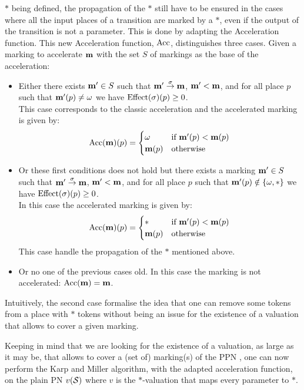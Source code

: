 $*$ being defined, the propagation of the $*$ still have to be ensured in the cases where all the input places of a transition are marked by a $*$, even if the output of the transition is not a parameter.
This is done by adapting the Acceleration function.
This new Acceleration function, $\operatorname{Acc}$, distinguishes three cases.
Given a marking to accelerate $\mathbf{m}$ with the set $S$ of markings as the base of the acceleration:
\begin{itemize}
  \item Either there exists $\mathbf{m'} \in S$ such that $\mathbf{m'} \stackrel{\sigma}{\to} \mathbf{m}$, $\mathbf{m'} < \mathbf{m}$, and for all place $p$ such that $\mathbf{m'}(p) \neq \omega$ we have $\operatorname{Effect}(\sigma)(p) \geq 0$.\\
    This case corresponds to the classic acceleration and
    the accelerated marking is given by:
    \[
      \operatorname{Acc}(\mathbf{m})(p) = \begin{cases} \omega &\text{if } \mathbf{m'}(p) < \mathbf{m}(p) \\ \mathbf{m}(p) &\text{otherwise} \end{cases}
    \]
  \item Or these first conditions does not hold but there exists a marking $\mathbf{m'} \in S$ such that $\mathbf{m'} \stackrel{\sigma}{\to} \mathbf{m}$, $\mathbf{m'} < \mathbf{m}$, and for all place $p$ such that $\mathbf{m'}(p) \notin \{\omega, *\}$ we have $\operatorname{Effect}(\sigma)(p) \geq 0$.\\
    In this case
    the accelerated marking is given by:
    \[
      \operatorname{Acc}(\mathbf{m})(p) = \begin{cases} * &\text{if } \mathbf{m'}(p) < \mathbf{m}(p) \\ \mathbf{m}(p) &\text{otherwise} \end{cases}
    \]
    This case handle the propagation of the $*$ mentioned above.
  \item Or no one of the previous cases old.
    In this case the marking is not accelerated: $\operatorname{Acc}(\mathbf{m}) = \mathbf{m}$.
\end{itemize}

Intuitively, the second case formalise the idea that one can remove some tokens from a place with $*$ tokens without being an issue for the existence of a valuation that allows to cover a given marking.

Keeping in mind that we are looking for the existence of a valuation, as large as it may be, that allows to cover a (set of) marking(s) of the \ac{PPN} \PPN, one can now perform the Karp and Miller algorithm, with the adapted acceleration function, on the plain \ac{PN} $v(\mathcal{S})$ where $v$ is the $*$-valuation that maps every parameter to $*$.

